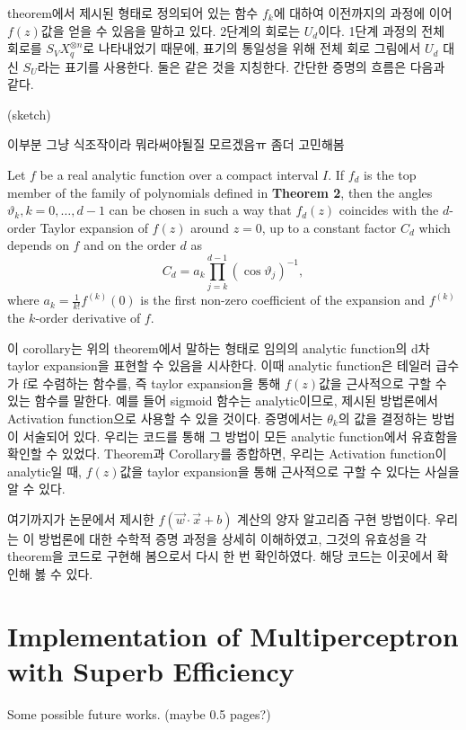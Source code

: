 theorem에서 제시된 형태로 정의되어 있는 함수 \(f_k\)에 대하여 이전까지의 과정에 이어 \(f(z)\)값을 얻을 수 있음을 말하고 있다.
2단계의 회로는 \(U_d\)이다. 1단계 과정의 전체 회로를 \(S_VX_q^{\otimes n}\)로 나타내었기 때문에, 표기의 통일성을 위해 전체 회로 그림에서 \(U_d\) 대신 \(S_U\)라는 표기를 사용한다. 둘은 같은 것을 지칭한다.
간단한 증명의 흐름은 다음과 같다.

\begin{pf}(sketch)
    
    이부분 그냥 식조작이라 뭐라써야될질 모르겠음ㅠ 좀더 고민해봄
\end{pf}

\begin{corollary}
    
Let $f$ be a real analytic function over a compact interval $I$. If $f_d$ is the top member of the family of polynomials defined in \textbf{Theorem 2}, then the angles $\vartheta_k, k = 0, \ldots, d-1$ can be chosen in such a way that $f_d(z)$ coincides with the $d$-order Taylor expansion of $f(z)$ around $z = 0$, up to a constant factor $C_d$ which depends on $f$ and on the order $d$ as
\[
C_d = a_k \prod_{j=k}^{d-1} (\cos \vartheta_j)^{-1},
\]
where $a_k = \frac{1}{k!} f^{(k)}(0)$ is the first non-zero coefficient of the expansion and $f^{(k)}$ the $k$-order derivative of $f$.

\end{corollary}

이 corollary는 위의 theorem에서 말하는 형태로 임의의 analytic function의 d차 taylor expansion을 표현할 수 있음을 시사한다.
이때 analytic function은 테일러 급수가 f로 수렴하는 함수를, 즉 taylor expansion을 통해 \(f(z)\)값을 근사적으로 구할 수 있는 함수를 말한다.
예를 들어 sigmoid 함수는 analytic이므로, 제시된 방법론에서 Activation function으로 사용할 수 있을 것이다.
증명에서는 \(\theta_k\)의 값을 결정하는 방법이 서술되어 있다. 우리는 코드를 통해 그 방법이 모든 analytic function에서 유효함을 확인할 수 있었다.
Theorem과 Corollary를 종합하면, 우리는 Activation function이 analytic일 때, \(f(z)\)값을 taylor expansion을 통해 근사적으로 구할 수 있다는 사실을 알 수 있다.

여기까지가 논문에서 제시한 \(f(\vec{w}\cdot\vec{x}+b)\) 계산의 양자 알고리즘 구현 방법이다.
우리는 이 방법론에 대한 수학적 증명 과정을 상세히 이해하였고, 그것의 유효성을 각 theorem을 코드로 구현해 봄으로서 다시 한 번 확인하였다. 해당 코드는 이곳에서 확인해 봃 수 있다.

\section{Implementation of Multiperceptron with Superb Efficiency}
Some possible future works. (maybe 0.5 pages?)